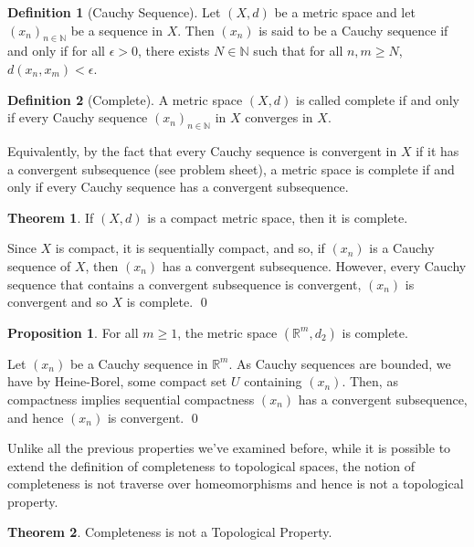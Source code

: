 \documentclass[
]{article}
\theoremstyle{definition}
\newtheorem{theorem}{Theorem}
\newtheorem{prop}{Proposition}
\theoremstyle{definition}
\newtheorem{definition}{Definition}[section]
\begin{document}
\begin{definition}[Cauchy Sequence]
  Let \((X, d)\) be a metric space and let \((x_n)_{n \in \mathbb{N}}\) be a sequence 
  in \(X\). Then \((x_n)\) is said to be a Cauchy sequence if and only if for all 
  \(\epsilon > 0\), there exists \(N \in \mathbb{N}\) such that for all 
  \(n, m \ge N\), \(d(x_n, x_m) < \epsilon\).
\end{definition}

\begin{definition}[Complete]
  A metric space \((X, d)\) is called complete if and only if every Cauchy sequence 
  \((x_n)_{n \in \mathbb{N}}\) in \(X\) converges in \(X\).
\end{definition}

Equivalently, by the fact that every Cauchy sequence is convergent in
\(X\) if it has a convergent subsequence (see problem sheet), a metric
space is complete if and only if every Cauchy sequence has a convergent
subsequence.

\begin{theorem}
  If \((X, d)\) is a compact metric space, then it is complete.
\end{theorem}
\proof

Since \(X\) is compact, it is sequentially compact, and so, if \((x_n)\)
is a Cauchy sequence of \(X\), then \((x_n)\) has a convergent
subsequence. However, every Cauchy sequence that contains a convergent
subsequence is convergent, \((x_n)\) is convergent and so \(X\) is
complete. \qed

\begin{prop}
  For all \(m \ge 1\), the metric space \((\mathbb{R}^m, d_2)\) is complete.
\end{prop}
\proof

Let \((x_n)\) be a Cauchy sequence in \(\mathbb{R}^m\). As Cauchy
sequences are bounded, we have by Heine-Borel, some compact set \(U\)
containing \((x_n)\). Then, as compactness implies sequential
compactness \((x_n)\) has a convergent subsequence, and hence \((x_n)\)
is convergent. \qed

Unlike all the previous properties we've examined before, while it is
possible to extend the definition of completeness to topological spaces,
the notion of completeness is not traverse over homeomorphisms and hence
is not a topological property.

\begin{theorem}
  Completeness is not a Topological Property.
\end{theorem}
\proof
\end{document}
